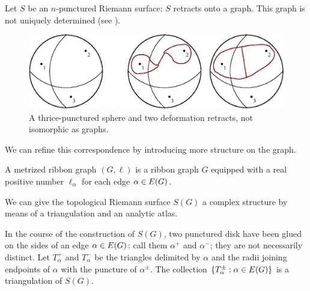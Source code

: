 Let $S$ be an $n$-punctured Riemann surface: $S$ retracts onto a
graph. This graph is not uniquely determined (see
).
\begin{figure}[bt]
  \centering\includegraphics[width=\textwidth]{sfera3}
  \caption{A thrice-punctured sphere and two deformation retracts, not
    isomorphic as graphs.}
  \label{fig:sphere-retracts}
\end{figure}
We can refine this correspondence by introducing more structure on the
graph.
\begin{definition}
  \label{dfn:metric-ribbon-graphs}
  A metrized ribbon graph $(G, \ell)$ is a ribbon graph $G$ equipped with
  a real positive number $\ell_\alpha$ for each edge $\alpha \in E(G)$.
\end{definition}

We can give the topological Riemann surface $S(G)$ a complex
structure by means of a triangulation and an analytic atlas.

In the course of the construction of $S(G)$, two punctured disk have
been glued on the sides of an edge $\alpha \in E(G)$: call them $\alpha^+$
and $\alpha^-$; they are not necessarily distinct.  Let $T_\alpha^+$ and $T_\alpha^-$
be the triangles delimited by $\alpha$ and the radii joining endpoints of
$\alpha$ with the puncture of $\alpha^\pm$. The collection $\{T_\alpha^\pm : \alpha \in
E(G)\}$ is a triangulation of $S(G)$.

